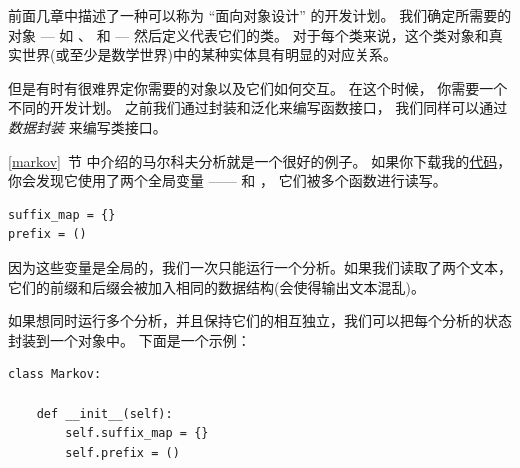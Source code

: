 前面几章中描述了一种可以称为 ``面向对象设计'' 的开发计划。
我们确定所需要的对象 --- 如 、  和  --- 然后定义代表它们的类。
对于每个类来说，这个类对象和真实世界(或至少是数学世界)中的某种实体具有明显的对应关系。



但是有时有很难界定你需要的对象以及它们如何交互。
在这个时候， 你需要一个不同的开发计划。
之前我们通过封装和泛化来编写函数接口， 我们同样可以通过 {\em 数据封装} 来编写类接口。



\ref{markov}~节 中介绍的马尔科夫分析就是一个很好的例子。
如果你下载我的\href{http://thinkpython2.com/code/markov.py}{代码}， 你会发现它使用了两个全局变量 ——  和 ， 它们被多个函数进行读写。

\begin{lstlisting}
suffix_map = {}
prefix = ()
\end{lstlisting}


因为这些变量是全局的，我们一次只能运行一个分析。如果我们读取了两个文本，
它们的前缀和后缀会被加入相同的数据结构(会使得输出文本混乱)。


如果想同时运行多个分析，并且保持它们的相互独立，我们可以把每个分析的状态封装到一个对象中。
下面是一个示例：

\begin{lstlisting}
class Markov:

    def __init__(self):
        self.suffix_map = {}
        self.prefix = ()
\end{lstlisting}

